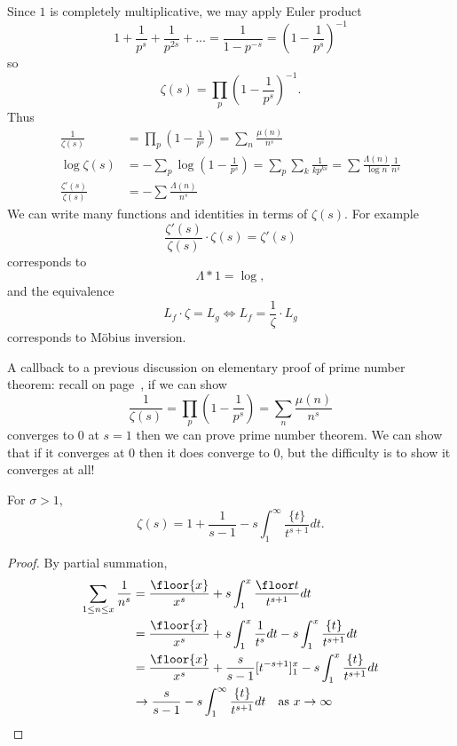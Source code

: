 \documentclass[a4paper]{article}
\theoremstyle{definition}
\begin{document}
Since \(1\) is completely multiplicative, we may apply Euler product
\[
  1 + \frac{1}{p^s} + \frac{1}{p^{2s}} + \dots = \frac{1}{1 - p^{-s}} = \left( 1 - \frac{1}{p^s} \right)^{-1}
\]
so
\[
  \zeta(s) = \prod_p \left( 1 - \frac{1}{p^s} \right)^{-1}.
\]
Thus
\begin{align*}
  \frac{1}{\zeta(s)} &= \prod_p \left( 1 - \frac{1}{p^s} \right) = \sum_n \frac{\mu(n)}{n^s} \\
  \log \zeta(s) &= - \sum_p \log (1 - \frac{1}{p^s}) = \sum_p\sum_k \frac{1}{k p^{ks}} = \sum \frac{\Lambda(n)}{\log n} \frac{1}{n^s} \\
  \frac{\zeta'(s)}{\zeta(s)} &= - \sum \frac{\Lambda(n)}{n^s}
\end{align*}
We can write many functions and identities in terms of \(\zeta(s)\). For example
\[
  \frac{\zeta'(s)}{\zeta(s)} \cdot \zeta(s) = \zeta'(s)
\]
corresponds to
\[
  \Lambda * 1 = \log,
\]
and the equivalence
\[
  L_f \cdot \zeta = L_g \iff L_f = \frac{1}{\zeta} \cdot L_g
\]
corresponds to Möbius inversion.

A callback to a previous discussion on elementary proof of prime number theorem: recall on page~\pageref{proof:attempted elementary proof of PNT}, if we can show
\[
  \frac{1}{\zeta(s)} = \prod_p \left( 1 - \frac{1}{p^s} \right) = \sum_n \frac{\mu(n)}{n^s}
\]
converges to \(0\) at \(s = 1\) then we can prove prime number theorem. We can show that if it converges at \(0\) then it does converge to \(0\), but the difficulty is to show it converges at all!

\begin{lemma}
  For \(\sigma > 1\),
  \[
    \zeta(s) = 1 + \frac{1}{s - 1} - s \int_1^\infty \frac{\{t\}}{t^{s + 1}} dt.
  \]
\end{lemma}

\begin{proof}
  By partial summation,
  \begin{align*}
    \sum_{1 \leq n \leq x} \frac{1}{n^s}
    &= \frac{\floor{x}}{x^s} + s \int_1^x \frac{\floor t}{t^{s + 1}} dt \\
    &= \frac{\floor{x}}{x^s} + s \int_1^x \frac{1}{t^s} dt - s \int_1^x \frac{\{t\}}{t^{s + 1}} dt \\
    &= \frac{\floor{x}}{x^s} + \frac{s}{s - 1} [t^{-s + 1}]_1^x - s \int_1^x \frac{\{t\}}{t^{s + 1}} dt \\
    &\to \frac{s}{s - 1} - s \int_1^\infty \frac{\{t\}}{t^{s + 1}} dt \quad \text{as } x \to \infty
  \end{align*}
\end{proof}
\end{document}
